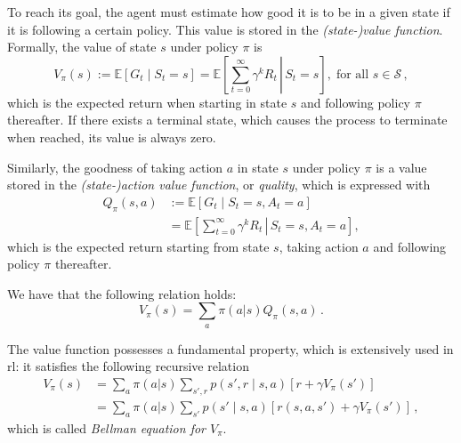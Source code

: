 To reach its goal, the agent must estimate how good it is to be in a given state if it is following a certain policy. This value is stored in the \emph{(state-)value function}. Formally, the value of state $s$ under policy $\pi$ is
\begin{equation}
    V_\pi (s) := \mathbb E \left[ G_t \mid S_t = s \right] = \mathbb E \left[ \left. \sum_{t=0}^\infty \gamma^k R_t \, \right| \, S_t = s \right], \; \text{for all } s \in \mathcal S \, ,
\end{equation}
which is the expected return when starting in state $s$ and following policy $\pi$ thereafter. If there exists a terminal state, which causes the process to terminate when reached, its value is always zero.

Similarly, the goodness of taking action $a$ in state $s$ under policy $\pi$ is a value stored in the \emph{(state-)action value function}, or \emph{quality}, which is expressed with
\begin{equation}
    \begin{aligned}
        Q_\pi(s,a)
        &:= \mathbb E \left[ G_t \mid S_t = s, A_t = a \right] \\
        &= \mathbb E \left[ \left. \sum_{t=0}^\infty \gamma^k R_t \, \right| \, S_t = s, A_t = a \right],
    \end{aligned}
    \label{eq:Q}
\end{equation}
which is the expected return starting from state $s$, taking action $a$ and following policy $\pi$ thereafter.

We have that the following relation holds:
\begin{equation}
    V_\pi(s) = \sum_a \pi(a|s) Q_\pi(s,a) \, .
\end{equation}

The value function possesses a fundamental property, which is extensively used in \acrshort{rl}: it satisfies the following recursive relation
\begin{equation}
    \begin{aligned}
        V_\pi (s)
        &= \sum_a \pi(a|s) \sum_{s', r} p(s', r \mid s, a) \left[ r + \gamma V_\pi (s') \right] \\
        &= \sum_a \pi(a|s) \sum_{s'} p(s' \mid s, a) \left[ r(s,a,s') + \gamma V_\pi (s') \right] \, ,
    \end{aligned}
\end{equation}
which is called \emph{Bellman equation for $V_\pi$}.

